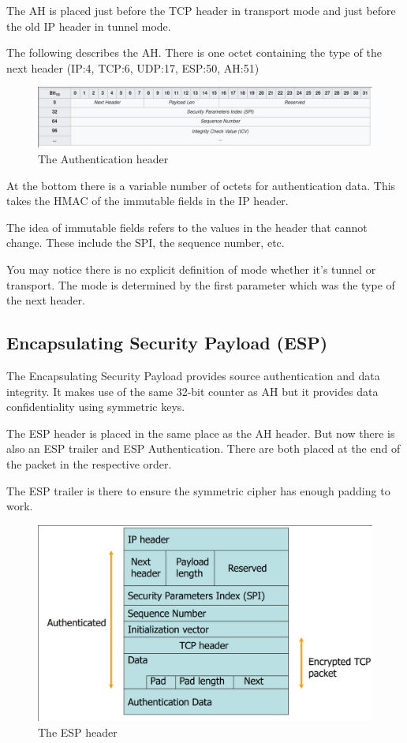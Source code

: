 \documentclass{report}
\begin{document}
The AH is placed just before the TCP header in transport mode and just before
the old IP header in tunnel mode.

The following describes the AH.
There is one octet containing the type of the next header
(IP:4, TCP:6, UDP:17, ESP:50, AH:51)

\begin{figure}[h]
    \centering
    \includegraphics[width=\textwidth]{images/ah.png}
    \caption{The Authentication header}
\end{figure}

At the bottom there is a variable number of octets for authentication data.
This takes the HMAC of the immutable fields in the IP header.

The idea of immutable fields refers to the values in the header that cannot
change. These include the SPI, the sequence number, etc.

You may notice there is no explicit definition of mode whether it's tunnel
or transport. The mode is determined by the first parameter which was the type
of the next header.

\subsection{Encapsulating Security Payload (ESP)}
The Encapsulating Security Payload provides source authentication and data
integrity. It makes use of the same 32-bit counter as AH but it provides
data confidentiality using symmetric keys.

The ESP header is placed in the same place as the AH header. But now there
is also an ESP trailer and ESP Authentication. There are both placed at the
end of the packet in the respective order.

The ESP trailer is there to ensure the symmetric cipher has enough padding
to work.

\begin{figure}[h]
    \centering
    \includegraphics[width=\textwidth]{images/esppacket.png}
    \caption{The ESP header}
\end{figure}
\end{document}
